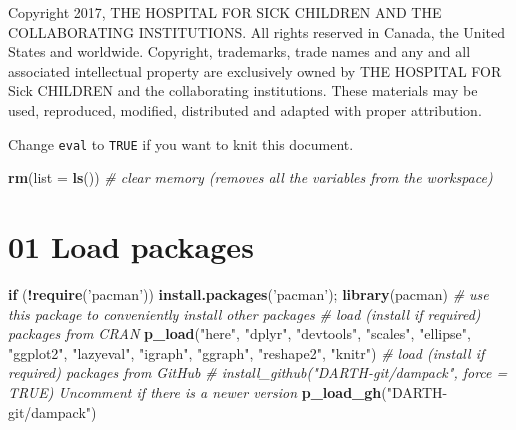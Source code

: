 \documentclass[
]{article}
\newenvironment{Shaded}{\begin{snugshade}}{\end{snugshade}}
\newcommand{\CommentTok}[1]{\textcolor[rgb]{0.56,0.35,0.01}{\textit{#1}}}
\newcommand{\ControlFlowTok}[1]{\textcolor[rgb]{0.13,0.29,0.53}{\textbf{#1}}}
\newcommand{\DataTypeTok}[1]{\textcolor[rgb]{0.13,0.29,0.53}{#1}}
\newcommand{\KeywordTok}[1]{\textcolor[rgb]{0.13,0.29,0.53}{\textbf{#1}}}
\newcommand{\NormalTok}[1]{#1}
\newcommand{\OperatorTok}[1]{\textcolor[rgb]{0.81,0.36,0.00}{\textbf{#1}}}
\newcommand{\StringTok}[1]{\textcolor[rgb]{0.31,0.60,0.02}{#1}}
\begin{document}
Copyright 2017, THE HOSPITAL FOR SICK CHILDREN AND THE COLLABORATING
INSTITUTIONS. All rights reserved in Canada, the United States and
worldwide. Copyright, trademarks, trade names and any and all associated
intellectual property are exclusively owned by THE HOSPITAL FOR Sick
CHILDREN and the collaborating institutions. These materials may be
used, reproduced, modified, distributed and adapted with proper
attribution.

\newpage

Change \texttt{eval} to \texttt{TRUE} if you want to knit this document.

\begin{Shaded}
\begin{Highlighting}[]
\KeywordTok{rm}\NormalTok{(}\DataTypeTok{list =} \KeywordTok{ls}\NormalTok{())      }\CommentTok{# clear memory (removes all the variables from the workspace)}
\end{Highlighting}
\end{Shaded}

\hypertarget{load-packages}{%
\section{01 Load packages}\label{load-packages}}

\begin{Shaded}
\begin{Highlighting}[]
\ControlFlowTok{if}\NormalTok{ (}\OperatorTok{!}\KeywordTok{require}\NormalTok{(}\StringTok{'pacman'}\NormalTok{)) }\KeywordTok{install.packages}\NormalTok{(}\StringTok{'pacman'}\NormalTok{); }\KeywordTok{library}\NormalTok{(pacman) }\CommentTok{# use this package to conveniently install other packages}
\CommentTok{# load (install if required) packages from CRAN}
\KeywordTok{p_load}\NormalTok{(}\StringTok{"here"}\NormalTok{, }\StringTok{"dplyr"}\NormalTok{, }\StringTok{"devtools"}\NormalTok{, }\StringTok{"scales"}\NormalTok{, }\StringTok{"ellipse"}\NormalTok{, }\StringTok{"ggplot2"}\NormalTok{, }\StringTok{"lazyeval"}\NormalTok{, }\StringTok{"igraph"}\NormalTok{, }\StringTok{"ggraph"}\NormalTok{, }
       \StringTok{"reshape2"}\NormalTok{, }\StringTok{"knitr"}\NormalTok{)                                               }
\CommentTok{# load (install if required) packages from GitHub}
\CommentTok{# install_github("DARTH-git/dampack", force = TRUE) Uncomment if there is a newer version}
\KeywordTok{p_load_gh}\NormalTok{(}\StringTok{"DARTH-git/dampack"}\NormalTok{) }
\end{Highlighting}
\end{Shaded}
\end{document}
